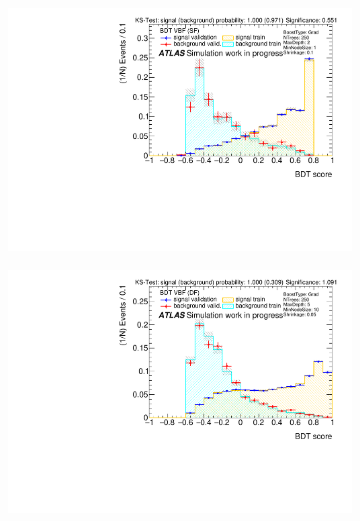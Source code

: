 \begin{figure}[htbp]
    \centering
    \begin{subfigure}[t]{0.49\textwidth}
        \includegraphics[width=\textwidth]{./plots/mva/variable_reduction/VBF_SF_bdt_output_clean.pdf}
    \end{subfigure}
    \begin{subfigure}[t]{0.49\textwidth}
        \includegraphics[width=\textwidth]{./plots/mva/variable_reduction/VBF_DF_bdt_output_clean.pdf}
    \end{subfigure}
    \begin{subfigure}[t]{0.49\textwidth}

\end{subfigure}
\end{figure}
